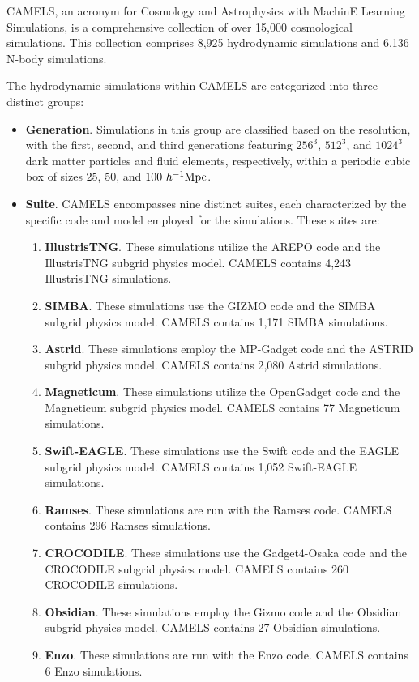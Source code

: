 \documentclass{article}
\begin{document}
CAMELS, an acronym for Cosmology and Astrophysics with MachinE Learning Simulations, is a comprehensive collection of over 15,000 cosmological simulations. This collection comprises 8,925 hydrodynamic simulations and 6,136 N-body simulations.

The hydrodynamic simulations within CAMELS are categorized into three distinct groups:

\begin{itemize}
\item \textbf{Generation}. Simulations in this group are classified based on the resolution, with the first, second, and third generations featuring $256^3$, $512^3$, and $1024^3$ dark matter particles and fluid elements, respectively, within a periodic cubic box of sizes $25$, $50$, and $100~h^{-1}{\rm Mpc}$.
\item \textbf{Suite}.  CAMELS encompasses nine distinct suites, each characterized by the specific code and model employed for the simulations. These suites are:

\begin{enumerate}
\item \textbf{IllustrisTNG}. These simulations utilize the AREPO code and the IllustrisTNG subgrid physics model. CAMELS contains 4,243 IllustrisTNG simulations.
\item \textbf{SIMBA}. These simulations use the GIZMO code and the SIMBA subgrid physics model. CAMELS contains 1,171 SIMBA simulations.
\item \textbf{Astrid}.  These simulations employ the MP-Gadget code and the ASTRID subgrid physics model. CAMELS contains 2,080 Astrid simulations.
\item \textbf{Magneticum}. These simulations utilize the OpenGadget code and the Magneticum subgrid physics model. CAMELS contains 77 Magneticum simulations.
\item \textbf{Swift-EAGLE}. These simulations use the Swift code and the EAGLE subgrid physics model. CAMELS contains 1,052 Swift-EAGLE simulations.
\item \textbf{Ramses}. These simulations are run with the Ramses code. CAMELS contains 296 Ramses simulations.
\item \textbf{CROCODILE}. These simulations use the Gadget4-Osaka code and the CROCODILE subgrid physics model. CAMELS contains 260 CROCODILE simulations.
\item \textbf{Obsidian}. These simulations employ the Gizmo code and the Obsidian subgrid physics model. CAMELS contains 27 Obsidian simulations.
\item \textbf{Enzo}. These simulations are run with the Enzo code. CAMELS contains 6 Enzo simulations.
\end{enumerate}


\end{itemize}
\end{document}
